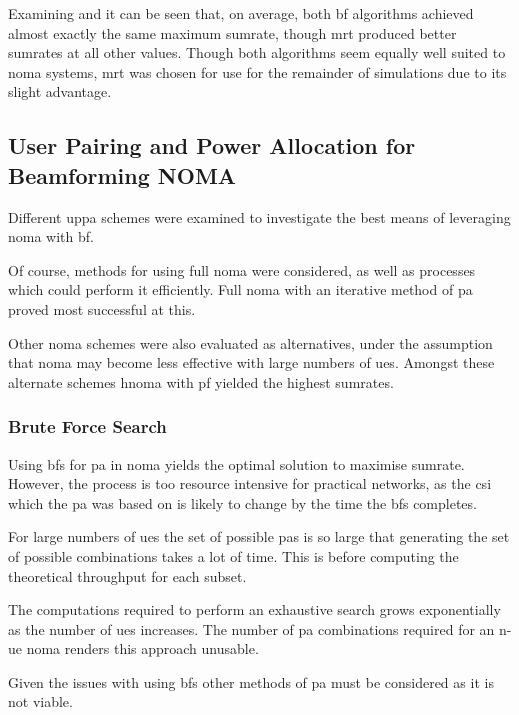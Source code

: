 \par
Examining  and  it can be seen that, on average, both \ac{bf} algorithms achieved almost exactly the same maximum sumrate, though \ac{mrt} produced better sumrates at all other values.
Though both algorithms seem equally well suited to \ac{noma} systems, \ac{mrt} was chosen for use for the remainder of simulations due to its slight advantage.

\subsection{User Pairing and Power Allocation for Beamforming NOMA}
\label{sec:concuppa}
Different \ac{uppa} schemes were examined to investigate the best means of leveraging \ac{noma} with \ac{bf}.

\par
Of course, methods for using full \ac{noma} were considered, as well as processes which could perform it efficiently. 
Full \ac{noma} with an iterative method of \ac{pa} proved most successful at this.

\par
Other \ac{noma} schemes were also evaluated as alternatives, under the assumption that \ac{noma} may become less effective with large numbers of \acp{ue}.
Amongst these alternate schemes \ac{hnoma} with \ac{pf} yielded the highest sumrates.

\subsubsection{Brute Force Search}
Using \ac{bfs} for \ac{pa} in \ac{noma} yields the optimal solution to maximise sumrate.
However, the process is too resource intensive for practical networks, as the \ac{csi} which the \ac{pa} was based on is likely to change by the time the \ac{bfs} completes.

\par
For large numbers of \acp{ue} the set of possible \acp{pa} is so large that generating the set of possible combinations takes a lot of time.
This is before computing the theoretical throughput for each subset.

\par
The computations required to perform an exhaustive search grows exponentially as the number of \acp{ue} increases.
The number of \ac{pa} combinations required for an n-\ac{ue} \ac{noma} renders this approach unusable.

\par
Given the issues with using \ac{bfs} other methods of \ac{pa} must be considered as it is not viable.

